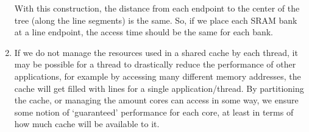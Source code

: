 \documentclass[12pt]{article}
\begin{document}
\begin{enumerate}[label=(\alph*)]
        With this construction, the distance from each endpoint to the center of the tree (along the line segments) is the same. So, if we place each SRAM bank at a line endpoint, the access time should be the same for each bank.

    \item
        If we do not manage the resources used in a shared cache by each thread, it may be possible for a thread to drastically reduce the performance of other applications, for example by accessing many different memory addresses, the cache will get filled with lines for a single application/thread. By partitioning the cache, or managing the amount cores can access in some way, we ensure some notion of `guaranteed' performance for each core, at least in terms of how much cache will be available to it.
    
\end{enumerate}
\end{document}
